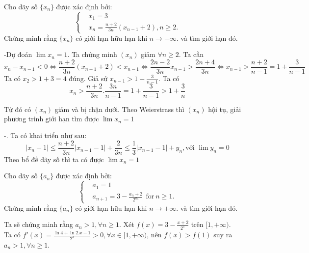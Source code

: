 \documentclass[11pt]{scrartcl}
\begin{document}
\begin{itemize}[label=, leftmargin=0em, itemsep=0.5em]
\begin{sol}
    \end{sol}
    \begin{bt}
        Cho dãy số $\{x_n\}$ được xác định bởi: $$\left\{\begin{aligned}& x_1=3 \\ & x_n=\frac{n+2}{3n}(x_{n-1}+2), n\geq 2.\end{aligned}\right.$$
        Chứng minh rằng $\{x_n\}$ có giới hạn hữu hạn khi $n\to+\infty.$ và tìm giới hạn đó.
    \end{bt}

    \begin{sol}
        -Dự đoán $\lim x_n = 1$. Ta chứng minh $(x_n)$ giảm $\forall n \geq 2$. Ta cần \[x_{n} - x_{n-1} < 0 \Leftrightarrow \frac{n + 2}{3n}(x_{n-1} + 2) < x_{n-1} \Leftrightarrow \frac{2n - 2}{3n}x_{n-1} > \frac{2n + 4}{3n} \Leftrightarrow x_{n-1} > \frac{n + 2}{n - 1} = 1 + \frac{3}{n-1}\]
        Ta có $x_2 > 1 + 3 = 4$ đúng. Giả sử $x_{n-1} > 1 + \frac{3}{n -1 }$. Ta có $$x_n > \frac{n + 2}{3n}.\frac{3n}{n - 1} = 1 + \frac{3}{n-1} > 1 + \frac{3}{n}$$

        Từ đó có $(x_n)$ giảm và bị chặn dưới. Theo Weierstrass thì $(x_n)$ hội tụ, giải phương trình giới hạn tìm được $\lim x_n = 1$



        -.
         Ta có khai triển như sau:
        \[|x_n  - 1| \leq \frac{n + 2}{3n}\left|x_{n-1} - 1\right| + \frac{2}{3n} \leq \frac{1}{3}|x_{n -1 } - 1| + y_n, \text{với } \lim y_n = 0\]
        Theo bổ đề dãy số thì ta có được $\lim x_n = 1$
    \end{sol}
    \vspace{1em}
    \begin{bt}
        Cho dãy số $\{a_n\}$ được xác định bởi: $$\left\{\begin{aligned}& a_1=1 \\ & a_{n+1}=3-\frac{a_{n}+2}{2^{a_{n}}}\ \ \text{for} \ n\geq 1.\end{aligned}\right.$$
        Chứng minh rằng $\{a_n\}$ có giới hạn hữu hạn khi $n\to+\infty.$ và tìm giới hạn đó.
    \end{bt}

    \begin{sol}
        Ta sẽ chứng minh rằng $a_n > 1, \forall n \geq 1$. Xét $f(x) = 3 - \frac{x + 2}{2^x}$ trên $[1,+\infty)$.\\ Ta có $f'(x) = \frac{\ln4 + \ln2. x - 1}{2^x} > 0, \forall x \in [1,+\infty)$, nên $f(x) > f(1)$ suy ra $a_n > 1, \forall n \geq 1$. 



\end{sol}
\end{itemize}
\end{document}
